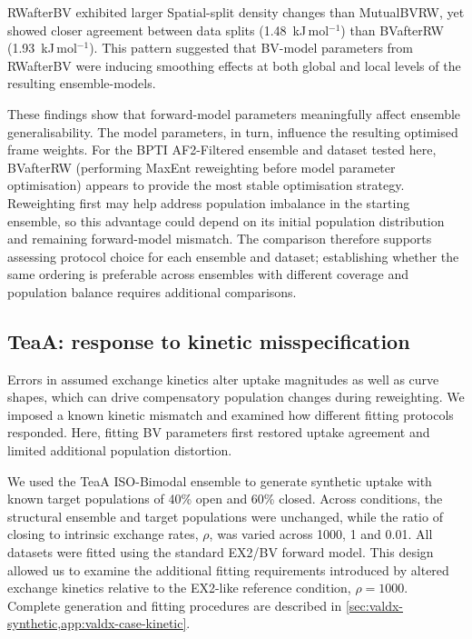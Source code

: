 RWafterBV exhibited larger Spatial-split density changes than MutualBVRW, yet showed closer agreement between data splits (1.48~kJ\,mol$^{-1}$) than BVafterRW (1.93~kJ\,mol$^{-1}$). This pattern suggested that BV-model parameters from RWafterBV were inducing smoothing effects at both global and local levels of the resulting ensemble-models.

These findings show that forward-model parameters meaningfully affect ensemble generalisability. The model parameters, in turn, influence the resulting optimised frame weights. For the BPTI AF2-Filtered ensemble and dataset tested here, BVafterRW (performing MaxEnt reweighting before model parameter optimisation) appears to provide the most stable optimisation strategy. Reweighting first may help address population imbalance in the starting ensemble, so this advantage could depend on its initial population distribution and remaining forward-model mismatch. The comparison therefore supports assessing protocol choice for each ensemble and dataset; establishing whether the same ordering is preferable across ensembles with different coverage and population balance requires additional comparisons.

\subsection{TeaA: response to kinetic misspecification}
\label{sec:valdx-kinetic-misspecification}

Errors in assumed exchange kinetics alter uptake magnitudes as well as curve shapes, which can drive compensatory population changes during reweighting. We imposed a known kinetic mismatch and examined how different fitting protocols responded. Here, fitting BV parameters first restored uptake agreement and limited additional population distortion.

We used the TeaA ISO-Bimodal ensemble to generate synthetic uptake with known target populations of 40\% open and 60\% closed. Across conditions, the structural ensemble and target populations were unchanged, while the ratio of closing to intrinsic exchange rates, $\rho$, was varied across 1000, 1 and 0.01. All datasets were fitted using the standard EX2/BV forward model. This design allowed us to examine the additional fitting requirements introduced by altered exchange kinetics relative to the EX2-like reference condition, $\rho=1000$. Complete generation and fitting procedures are described in \cref{sec:valdx-synthetic,app:valdx-case-kinetic}.

